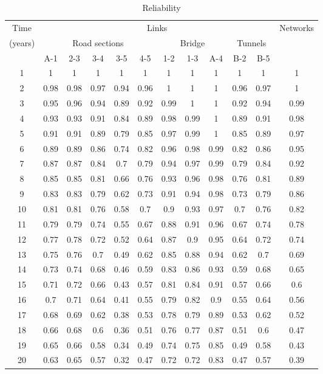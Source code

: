 \begin{table}[h]
\caption{Reliability}
\begin{tabular}{|c|c|c|c|c|c|c|c|c|c|c|c|}
\hline
Time & \multicolumn{10}{c|}{Links} & Networks \\ 
\cline{2-11}
(years) & \multicolumn{5}{c|}{Road sections} & \multicolumn{3}{c|}{Bridge} & \multicolumn{2}{c|}{Tunnels} &  \\ 
\cline{2-11}
 & A-1 & 2-3 & 3-4 & 3-5 & 4-5 & 1-2 & 1-3 & A-4 & B-2 & B-5 &  \\ 
\hline
1 & 1 & 1 & 1 & 1 & 1 & 1 & 1 & 1 & 1 & 1 & 1 \\ 
\hline
2 & 0.98 & 0.98 & 0.97 & 0.94 & 0.96 & 1 & 1 & 1 & 0.96 & 0.97 & 1 \\ 
\hline
3 & 0.95 & 0.96 & 0.94 & 0.89 & 0.92 & 0.99 & 1 & 1 & 0.92 & 0.94 & 0.99 \\ 
\hline
4 & 0.93 & 0.93 & 0.91 & 0.84 & 0.89 & 0.98 & 0.99 & 1 & 0.89 & 0.91 & 0.98 \\ 
\hline
5 & 0.91 & 0.91 & 0.89 & 0.79 & 0.85 & 0.97 & 0.99 & 1 & 0.85 & 0.89 & 0.97 \\ 
\hline
6 & 0.89 & 0.89 & 0.86 & 0.74 & 0.82 & 0.96 & 0.98 & 0.99 & 0.82 & 0.86 & 0.95 \\ 
\hline
7 & 0.87 & 0.87 & 0.84 & 0.7 & 0.79 & 0.94 & 0.97 & 0.99 & 0.79 & 0.84 & 0.92 \\ 
\hline
8 & 0.85 & 0.85 & 0.81 & 0.66 & 0.76 & 0.93 & 0.96 & 0.98 & 0.76 & 0.81 & 0.89 \\ 
\hline
9 & 0.83 & 0.83 & 0.79 & 0.62 & 0.73 & 0.91 & 0.94 & 0.98 & 0.73 & 0.79 & 0.86 \\ 
\hline
10 & 0.81 & 0.81 & 0.76 & 0.58 & 0.7 & 0.9 & 0.93 & 0.97 & 0.7 & 0.76 & 0.82 \\ 
\hline
11 & 0.79 & 0.79 & 0.74 & 0.55 & 0.67 & 0.88 & 0.91 & 0.96 & 0.67 & 0.74 & 0.78 \\ 
\hline
12 & 0.77 & 0.78 & 0.72 & 0.52 & 0.64 & 0.87 & 0.9 & 0.95 & 0.64 & 0.72 & 0.74 \\ 
\hline
13 & 0.75 & 0.76 & 0.7 & 0.49 & 0.62 & 0.85 & 0.88 & 0.94 & 0.62 & 0.7 & 0.69 \\ 
\hline
14 & 0.73 & 0.74 & 0.68 & 0.46 & 0.59 & 0.83 & 0.86 & 0.93 & 0.59 & 0.68 & 0.65 \\ 
\hline
15 & 0.71 & 0.72 & 0.66 & 0.43 & 0.57 & 0.81 & 0.84 & 0.91 & 0.57 & 0.66 & 0.6 \\ 
\hline
16 & 0.7 & 0.71 & 0.64 & 0.41 & 0.55 & 0.79 & 0.82 & 0.9 & 0.55 & 0.64 & 0.56 \\ 
\hline
17 & 0.68 & 0.69 & 0.62 & 0.38 & 0.53 & 0.78 & 0.79 & 0.89 & 0.53 & 0.62 & 0.52 \\ 
\hline
18 & 0.66 & 0.68 & 0.6 & 0.36 & 0.51 & 0.76 & 0.77 & 0.87 & 0.51 & 0.6 & 0.47 \\ 
\hline
19 & 0.65 & 0.66 & 0.58 & 0.34 & 0.49 & 0.74 & 0.75 & 0.85 & 0.49 & 0.58 & 0.43 \\ 
\hline
20 & 0.63 & 0.65 & 0.57 & 0.32 & 0.47 & 0.72 & 0.72 & 0.83 & 0.47 & 0.57 & 0.39 \\ 
\hline
\end{tabular}
\label{tblavaimain:13}
\end{table}

